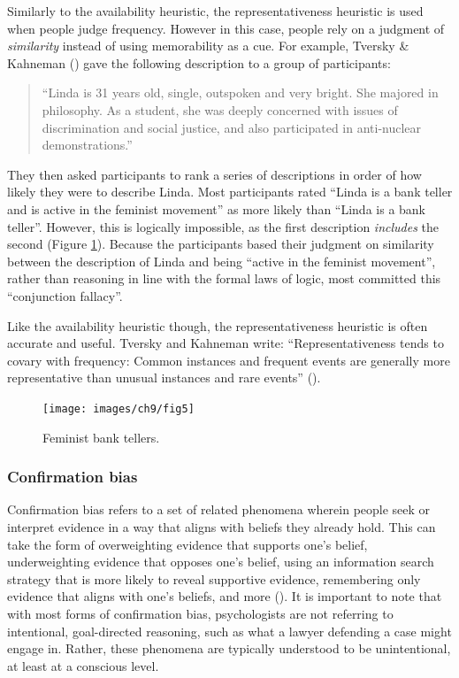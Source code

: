 \documentclass[
]{krantz}
\begin{document}
Similarly to the availability heuristic, the representativeness heuristic is used when people judge frequency. However in this case, people rely on a judgment of \emph{similarity} instead of using memorability as a cue. For example, Tversky \& Kahneman () gave the following description to a group of participants:

\begin{quote}
``Linda is 31 years old, single, outspoken and very bright. She majored in philosophy. As a student, she was deeply concerned with issues of discrimination and social justice, and also participated in anti-nuclear demonstrations.''
\end{quote}

They then asked participants to rank a series of descriptions in order of how likely they were to describe Linda. Most participants rated ``Linda is a bank teller and is active in the feminist movement'' as more likely than ``Linda is a bank teller''. However, this is logically impossible, as the first description \emph{includes} the second (Figure \ref{fig:bank}). Because the participants based their judgment on similarity between the description of Linda and being ``active in the feminist movement'', rather than reasoning in line with the formal laws of logic, most committed this ``conjunction fallacy''.

Like the availability heuristic though, the representativeness heuristic is often accurate and useful. Tversky and Kahneman write: ``Representativeness tends to covary with frequency: Common instances and frequent events are generally more representative than unusual instances and rare events'' ().

\begin{figure}

{\centering \texttt{[image: images/ch9/fig5]} 

}

\caption{Feminist bank tellers.}\label{fig:bank}
\end{figure}

\subsubsection*{Confirmation bias}\label{confirmation-bias-1}


Confirmation bias refers to a set of related phenomena wherein people seek or interpret evidence in a way that aligns with beliefs they already hold. This can take the form of overweighting evidence that supports one's belief, underweighting evidence that opposes one's belief, using an information search strategy that is more likely to reveal supportive evidence, remembering only evidence that aligns with one's beliefs, and more (). It is important to note that with most forms of confirmation bias, psychologists are not referring to intentional, goal-directed reasoning, such as what a lawyer defending a case might engage in. Rather, these phenomena are typically understood to be unintentional, at least at a conscious level.
\end{document}
